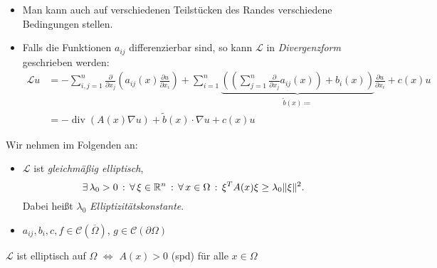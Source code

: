 \documentclass{cheat-sheet}
\newcommand{\Cont}{\mathcal{C}} %
\newcommand{\clos}[1]{\overline{#1}} %
\newcommand{\cOmega}{\clos{\Omega}} %
\newcommand{\bOmega}{\partial \Omega} %
\newcommand{\LL}{\mathcal{L}} %
\DeclareMathOperator{\dive}{div} %
\begin{document}
\begin{bemn}
  \begin{itemize}
    \item Man kann auch auf verschiedenen Teilstücken des Randes verschiedene Bedingungen stellen.
    \item Falls die Funktionen $a_{ij}$ differenzierbar sind, so kann $\LL$ in \emph{Divergenzform} geschrieben werden:
    \begin{align*}
      \LL u & = - \!\!\! \sum_{i,j=1}^n \tfrac{\partial}{\partial x_j} \left( a_{ij}(x) \tfrac{\partial u}{\partial x_i} \right) \!+\! \sum_{i=1}^n \underbrace{\left((\sum_{j=1}^n \tfrac{\partial}{\partial x_j} a_{ij}(x) ) \!+\! b_i(x)\right)}_{\tilde{b}(x) \coloneqq} \tfrac{\partial u}{\partial x_i} \!+\! c(x) u \\
      & = - \dive(A(x) \nabla u) + \tilde{b}(x) \cdot \nabla u + c(x) u
    \end{align*}
  \end{itemize}
\end{bemn}

\begin{voraussetzung}
  Wir nehmen im Folgenden an:
  \begin{itemize}
    \item $\LL$ ist \emph{gleichmäßig elliptisch}, \dh{}
    \[ \exists \, {\lambda_0 > 0} \,:\, \forall \, {\xi \in \mathbb{R}^n} \,:\, \forall \, {x \in \Omega} \,:\, \xi^T A(x) \xi \geq \lambda_0 \lVert\xi\rVert^2. \]
    Dabei heißt $\lambda_0$ \emph{Elliptizitätskonstante}.
    \item $a_{ij}, b_i, c, f \in \Cont(\cOmega)$, $g \in \Cont(\bOmega)$
  \end{itemize}
\end{voraussetzung}

\begin{bem}
  $\LL$ ist elliptisch auf $\Omega$ $\iff$ $A(x) > 0$ (spd) für alle $x \in \Omega$
\end{bem}
\end{document}
